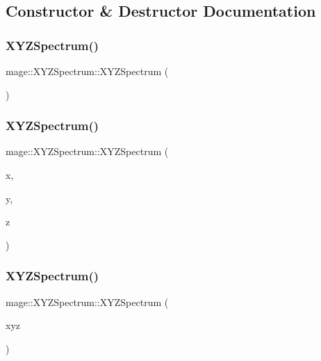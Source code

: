 \subsection{Constructor \& Destructor Documentation}
\hypertarget{structmage_1_1_x_y_z_spectrum_a93dbb49e9cb90dd0aed70e9b6d01fcc8}{}\label{structmage_1_1_x_y_z_spectrum_a93dbb49e9cb90dd0aed70e9b6d01fcc8} 
\subsubsection{\texorpdfstring{X\+Y\+Z\+Spectrum()}{XYZSpectrum()}\hspace{0.1cm}{\footnotesize\ttfamily [1/5]}}
{\footnotesize\ttfamily mage\+::\+X\+Y\+Z\+Spectrum\+::\+X\+Y\+Z\+Spectrum (\begin{DoxyParamCaption}{ }\end{DoxyParamCaption})}

\hypertarget{structmage_1_1_x_y_z_spectrum_ab768ef493970dd791f8b145eee05f66b}{}\label{structmage_1_1_x_y_z_spectrum_ab768ef493970dd791f8b145eee05f66b} 
\subsubsection{\texorpdfstring{X\+Y\+Z\+Spectrum()}{XYZSpectrum()}\hspace{0.1cm}{\footnotesize\ttfamily [2/5]}}
{\footnotesize\ttfamily mage\+::\+X\+Y\+Z\+Spectrum\+::\+X\+Y\+Z\+Spectrum (\begin{DoxyParamCaption}\item[{float}]{x,  }\item[{float}]{y,  }\item[{float}]{z }\end{DoxyParamCaption})}

\hypertarget{structmage_1_1_x_y_z_spectrum_ac86feefa604d578f219d17f721508357}{}\label{structmage_1_1_x_y_z_spectrum_ac86feefa604d578f219d17f721508357} 
\subsubsection{\texorpdfstring{X\+Y\+Z\+Spectrum()}{XYZSpectrum()}\hspace{0.1cm}{\footnotesize\ttfamily [3/5]}}
{\footnotesize\ttfamily mage\+::\+X\+Y\+Z\+Spectrum\+::\+X\+Y\+Z\+Spectrum (\begin{DoxyParamCaption}\item[{const \hyperlink{structmage_1_1_x_y_z_spectrum}{X\+Y\+Z\+Spectrum} \&}]{xyz }\end{DoxyParamCaption})}

